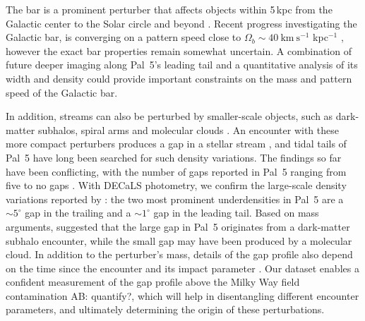 \documentclass[twocolumn]{aastex62}
\newcommand{\kms}{\ensuremath{\textrm{km}~\textrm{s}^{-1}}}
\newcommand{\ab}[1]{{\color{teal} AB: #1}}
\begin{document}
The bar is a prominent perturber that affects objects within 5\,kpc from the Galactic center \citep[e.g., the Ophiuchus stream,][]{Price-Whelan:2016b, Hattori:2016} to the Solar circle and beyond \citep[e.g., local phase-space overdensities][]{Hunt:2018, Monari:2019}.
Recent progress investigating the Galactic bar, is converging on a pattern speed close to $\Omega_b \sim 40 ~\kms$ kpc$^{-1}$ \citep[e.g.,][]{Clarke:2019, Sanders:2019, Bovy:2019}, however the exact bar properties remain somewhat uncertain.
A combination of future deeper imaging along Pal~5's leading tail and a quantitative analysis of its width and density could provide important constraints on the mass and pattern speed of the Galactic bar.

In addition, streams can also be perturbed by smaller-scale objects, such as dark-matter subhalos, spiral arms and molecular clouds \citep[e.g.,][]{Yoon:2011,Amorisco:2016, Banik:2019}.
An encounter with these more compact perturbers produces a gap in a stellar stream \citep[e.g.,][]{Johnston:2002,Ibata:2002}, and tidal tails of Pal~5 have long been searched for such density variations.
The findings so far have been conflicting, with the number of gaps reported in Pal~5 ranging from five \citep{Carlberg:2012} to no gaps \citep{Ibata:2016}.
With DECaLS photometry, we confirm the large-scale density variations reported by \citet{Erkal:2017}: the two most prominent underdensities in Pal~5 are a $\sim5^\circ$ gap in the trailing and a $\sim1^\circ$ gap in the leading tail.
Based on mass arguments, \citet{Erkal:2017} suggested that the large gap in Pal~5 originates from a dark-matter subhalo encounter, while the small gap may have been produced by a molecular cloud.
In addition to the perturber's mass, details of the gap profile also depend on the time since the encounter and its impact parameter \citep{Erkal:2015}.
Our dataset enables a confident measurement of the gap profile above the Milky Way field contamination \ab{quantify?}, which will help in disentangling different encounter parameters, and ultimately determining the origin of these perturbations.
\end{document}
